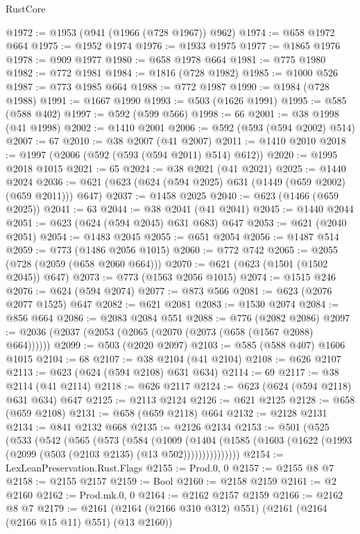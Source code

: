 \begin{lexlean}{RustCore}
\begin{coremodule}
@1972 := @1953 (@941 (@1966 (@728 @1967)) @962)
@1974 := @658 @1972 @664
@1975 := @1952 @1974
@1976 := @1933 @1975
@1977 := @1865 @1976
@1978 := @909 @1977
@1980 := @658 @1978 @664
@1981 := @775 @1980
@1982 := @772 @1981
@1984 := @1816 (@728 @1982)
@1985 := @1000 @526
@1987 := @773 @1985 @664
@1988 := @772 @1987
@1990 := @1984 (@728 @1988)
@1991 := @1667 @1990
@1993 := @503 (@1626 @1991)
@1995 := @585 (@588 @402)
@1997 := @592 (@599 @566)
@1998 := 66
@2001 := @38 @1998 (@41 @1998)
@2002 := @1410 @2001
@2006 := @592 (@593 (@594 @2002) @514)
@2007 := 67
@2010 := @38 @2007 (@41 @2007)
@2011 := @1410 @2010
@2018 := @1997 (@2006 (@592 (@593 (@594 @2011) @514) @612))
@2020 := @1995 @2018 @1015
@2021 := 65
@2024 := @38 @2021 (@41 @2021)
@2025 := @1440 @2024
@2036 := @621 (@623 (@624 (@594 @2025) @631 (@1449 (@659 @2002) (@659 @2011))) @647)
@2037 := @1458 @2025
@2040 := @623 (@1466 (@659 @2025))
@2041 := 63
@2044 := @38 @2041 (@41 @2041)
@2045 := @1440 @2044
@2051 := @623 (@624 (@594 @2045) @631 @683) @647
@2053 := @621 (@2040 @2051)
@2054 := @1483 @2045
@2055 := @651 @2054
@2056 := @1487 @514
@2059 := @773 (@1486 @2056 @1015)
@2060 := @772 @742
@2065 := @2055 (@728 (@2059 (@658 @2060 @664)))
@2070 := @621 (@623 (@1501 (@1502 @2045)) @647)
@2073 := @773 (@1563 @2056 @1015)
@2074 := @1515 @246
@2076 := @624 (@594 @2074)
@2077 := @873 @566
@2081 := @623 (@2076 @2077 @1525) @647
@2082 := @621 @2081
@2083 := @1530 @2074
@2084 := @856 @664
@2086 := @2083 @2084 @551
@2088 := @776 (@2082 @2086)
@2097 := @2036 (@2037 (@2053 (@2065 (@2070 (@2073 (@658 (@1567 @2088) @664))))))
@2099 := @503 (@2020 @2097)
@2103 := @585 (@588 @407) @1606 @1015
@2104 := 68
@2107 := @38 @2104 (@41 @2104)
@2108 := @626 @2107
@2113 := @623 (@624 (@594 @2108) @631 @634)
@2114 := 69
@2117 := @38 @2114 (@41 @2114)
@2118 := @626 @2117
@2124 := @623 (@624 (@594 @2118) @631 @634) @647
@2125 := @2113 @2124
@2126 := @621 @2125
@2128 := @658 (@659 @2108)
@2131 := @658 (@659 @2118) @664
@2132 := @2128 @2131
@2134 := @841 @2132 @668
@2135 := @2126 @2134
@2153 := @501
    (@525
      (@533
        (@542
          (@565
            (@573
              (@584
                (@1009
                  (@1404
                    (@1585 (@1603 (@1622 (@1993 (@2099 (@503 (@2103 @2135) (@13 @502)))))))))))))))
@2154 := LexLeanPreservation.Rust.Flags
@2155 := Prod.{0, 0}
@2157 := @2155 @8 @7
@2158 := @2155 @2157
@2159 := Bool
@2160 := @2158 @2159
@2161 := @2 @2160
@2162 := Prod.mk.{0, 0}
@2164 := @2162 @2157 @2159
@2166 := @2162 @8 @7
@2179 := @2161 (@2164 (@2166 @310 @312) @551) (@2161 (@2164 (@2166 @15 @11) @551) (@13 @2160))

\end{coremodule}
\end{lexlean}
